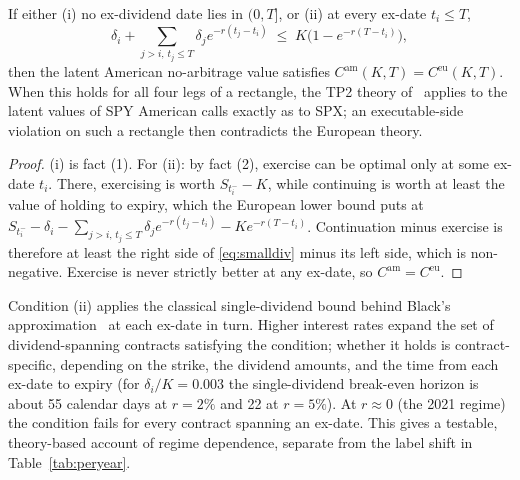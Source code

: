\documentclass[sigconf,review]{acmart}
\begin{document}
\begin{proposition}[Europeanization]\label{prop:euro}
If either (i) no ex-dividend date lies in $(0,T]$, or (ii) at every ex-date $t_i\le T$,
\begin{equation}
\textstyle\delta_i+\sum_{j>i,\,t_j\le T}\delta_j e^{-r(t_j-t_i)}\;\le\;K\big(1-e^{-r(T-t_i)}\big),
\label{eq:smalldiv}
\end{equation}
then the latent American no-arbitrage value satisfies $C^{\mathrm{am}}(K,T)=C^{\mathrm{eu}}(K,T)$. When this holds for all four legs of a rectangle, the TP2 theory of~\cite{glasserman2026tp2theory} applies to the latent values of SPY American calls exactly as to SPX; an executable-side violation on such a rectangle then contradicts the European theory.
\end{proposition}
\begin{proof}
(i) is fact (1). For (ii): by fact (2), exercise can be optimal only at some ex-date $t_i$. There, exercising is worth $S_{t_i^-}-K$, while continuing is worth at least the value of holding to expiry, which the European lower bound puts at $S_{t_i^-}-\delta_i-\sum_{j>i,\,t_j\le T}\delta_je^{-r(t_j-t_i)}-Ke^{-r(T-t_i)}$. Continuation minus exercise is therefore at least the right side of \eqref{eq:smalldiv} minus its left side, which is non-negative. Exercise is never strictly better at any ex-date, so $C^{\mathrm{am}}=C^{\mathrm{eu}}$.
\end{proof}
\noindent Condition (ii) applies the classical single-dividend bound behind Black's approximation~\cite{merton1973,black1975} at each ex-date in turn. Higher interest rates expand the set of dividend-spanning contracts satisfying the condition; whether it holds is contract-specific, depending on the strike, the dividend amounts, and the time from each ex-date to expiry (for $\delta_i/K=0.003$ the single-dividend break-even horizon is about 55 calendar days at $r=2\%$ and 22 at $r=5\%$). At $r\approx0$ (the 2021 regime) the condition fails for every contract spanning an ex-date. This gives a testable, theory-based account of regime dependence, separate from the label shift in Table~\ref{tab:peryear}.
\end{document}
